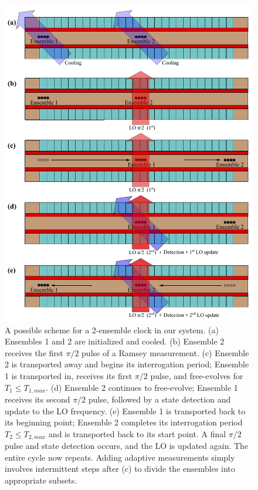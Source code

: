 \begin{figure}[hp]
    \begin{center}
        \includegraphics{figures/5/Fig_ClockScheme2}
        \caption{\label{fig:clockscheme} A possible scheme for a 2-ensemble clock in our system. (a) Ensembles 1 and 2 are initialized and cooled. (b) Ensemble 2 receives the first $\pi / 2$ pulse of a Ramsey measurement. (c) Ensemble 2 is transported away and begins its interrogation period; Ensemble 1 is transported in, receives its first $\pi / 2$ pulse, and free-evolves for $T_1 \leq T_{1,max}$. (d) Ensemble 2 continues to free-evolve; Ensemble 1 receives its second $\pi / 2$ pulse, followed by a state detection and update to the LO frequency. (e) Ensemble 1 is transported back to its beginning point; Ensemble 2 completes its interrogation period $T_2 \leq T_{2,max}$ and is transported back to its start point. A final $\pi /2$ pulse and state detection occurs, and the LO is updated again. The entire cycle now repeats. Adding adaptive measurements simply involves intermittent steps after (c) to divide the ensembles into appropriate subsets.   }
    \end{center}
\end{figure}

